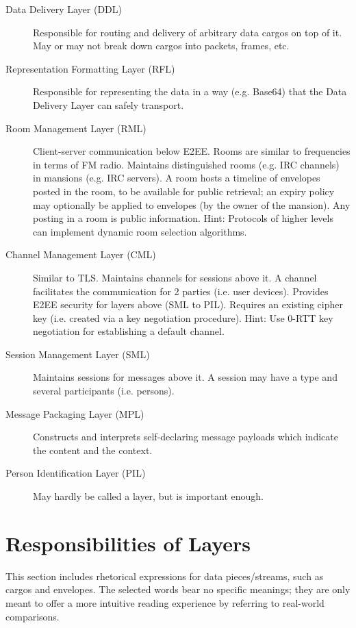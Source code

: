 \documentclass[a4paper,11pt]{article}
\begin{document}
\begin{description}
	\item[Data Delivery Layer (DDL)]
		Responsible for routing and delivery of arbitrary data cargos on top of it.
		May or may not break down cargos into packets, frames, etc.
	\item[Representation Formatting Layer (RFL)]
		Responsible for representing the data in a way (e.g. Base64) that the Data Delivery Layer can safely transport.
	\item[Room Management Layer (RML)]
		Client-server communication below E2EE.
		Rooms are similar to frequencies in terms of FM radio.
		Maintains distinguished rooms (e.g. IRC channels) in mansions (e.g. IRC servers).
		A room hosts a timeline of envelopes posted in the room, to be available for public retrieval;
		an expiry policy may optionally be applied to envelopes (by the owner of the mansion).
		Any posting in a room is public information.
		Hint: Protocols of higher levels can implement dynamic room selection algorithms.
	\item[Channel Management Layer (CML)]
		Similar to TLS.
		Maintains channels for sessions above it.
		A channel facilitates the communication for 2 parties (i.e. user devices).
		Provides E2EE security for layers above (SML to PIL).
		Requires an existing cipher key (i.e. created via a key negotiation procedure).
		Hint: Use 0-RTT key negotiation for establishing a default channel.
	\item[Session Management Layer (SML)]
		Maintains sessions for messages above it.
		A session may have a type and several participants (i.e. persons).
	\item[Message Packaging Layer (MPL)]
		Constructs and interprets self-declaring message payloads which indicate the content and the context.
	\item[Person Identification Layer (PIL)]
		May hardly be called a layer, but is important enough.
\end{description}





\section{Responsibilities of Layers}

This section includes rhetorical expressions for data pieces/streams, such as cargos and envelopes.
The selected words bear no specific meanings;
they are only meant to offer a more intuitive reading experience by referring to real-world comparisons.
\end{document}
